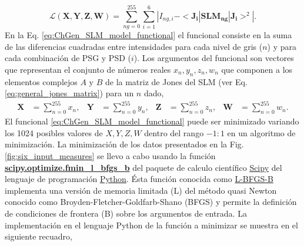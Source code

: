 \begin{equation}
\mathcal{L}(\mathbf{X,Y,Z,W}) = \sum_{ng=0}^{255}\sum_{i=1}^6 | I_{ng,i} -
<\mathbf{J_{i}}|\mathbf{SLM_{ng}}|\mathbf{J_{i}}>^2|.
\label{eq:ChGen_SLM_model_functional}  
\end{equation}
En la Eq. \ref{eq:ChGen_SLM_model_functional} el funcional consiste en
la suma de las diferencias cuadradas entre intensidades para cada
nivel de gris ($n$) y para cada combinación de PSG y PSD ($i$). Los
argumentos del funcional son vectores que representan el conjunto de números
reales $x_n, y_n, z_n, w_n$ que componen a los elementos complejos $A$ y $B$
de la matriz de Jones del SLM (ver 
Eq. \ref{eq:general_jones_matrix}) para un $n$ dado,
\begin{align*}
\mathbf{X} &= \sum_{n=0}^{255}x_n,&\mathbf{Y} &= \sum_{n=0}^{255}y_n,&\mathbf{Z} &= \sum_{n=0}^{255}z_n,&\mathbf{W} &= \sum_{n=0}^{255}w_n.
\end{align*} 
El funcional \ref{eq:ChGen_SLM_model_functional}  puede ser minimizado
variando los 1024 posibles valores 
de $X,Y,Z,W$ dentro del rango $-1:1$ en un algoritmo de
minimización. La minimización de los datos presentados en la
Fig. \ref{fig:six_input_measures} se llevo a cabo usando la función
 \href{http://goo.gl/tv5Iyz}{\bf{scipy.optimize.fmin\_l\_bfgs\_b}} del
 paquete de calculo científico \href{http://goo.gl/fRhz8s}{Scipy} del
 lenguaje de programación \href{https://www.python.org}{Python}. Ésta
 función conocida como \href{http://en.wikipedia.org/wiki/Limited-memory\_BFGS}{L-BFGS-B} implementa una versión de memoria limitada (L) del método quasi
 Newton conocido como Broyden-Fletcher-Goldfarb-Shano (BFGS) y permite
 la definición de condiciones de frontera (B) sobre los argumentos de
 entrada.  
La implementación en el lenguaje Python de la función a minimizar se muestra en el siguiente
recuadro, 
